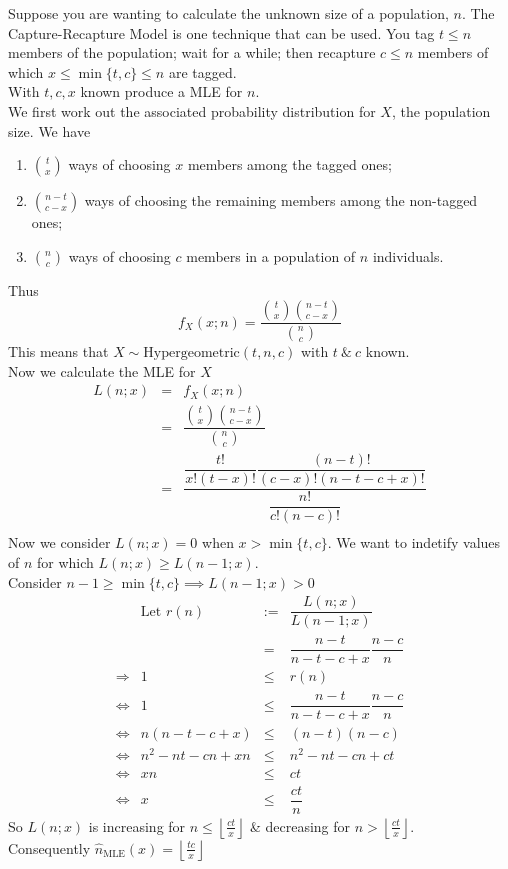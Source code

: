 \documentclass[11pt,a4paper]{article}
\begin{document}
Suppose you are wanting to calculate the unknown size of a population, $n$. The Capture-Recapture Model is one technique that can be used. You tag $t\leq n$ members of the population; wait for a while; then recapture $c\leq n$ members of which $x\leq\min\{t,c\}\leq n$ are tagged.\\
With $t,c,x$ known produce a MLE for $n$.\\
We first work out the associated probability distribution for $X$, the population size. We have
\begin{enumerate}[label=\roman*)]
	\item ${t \choose x}$ ways of choosing $x$ members among the tagged ones;
	\item ${{n-t} \choose {c-x}}$ ways of choosing the remaining members among the non-tagged ones;
	\item ${n \choose c}$ ways of choosing $c$ members in a population of $n$ individuals.
\end{enumerate}
Thus
$$f_X(x;n)=\frac{{t \choose x}{{n-t} \choose {c-x}}}{{n \choose c}}$$
This means that $X\sim\text{Hypergeometric}(t,n,c)$ with $t\ \&\ c$ known.\\
Now we calculate the MLE for $X$
\[\begin{array}{rcl}
L(n;x)&=&f_X(x;n)\\
&=&\dfrac{{t \choose x}{{n-t} \choose {c-x}}}{{n \choose c}}\\
&=&\dfrac{\dfrac{t!}{x!(t-x)!}\dfrac{(n-t)!}{(c-x)!(n-t-c+x)!}}{\dfrac{n!}{c!(n-c)!}}\\
\end{array}\]
Now we consider $L(n;x)=0$ when $x>\min\{t,c\}$. We want to indetify values of $n$ for which $L(n;x)\geq L(n-1;x)$.\\
Consider $n-1\geq\min\{t,c\}\implies L(n-1;x)>0$
\[\begin{array}{rrrl}
&\text{Let }r(n)&:=&\dfrac{L(n;x)}{L(n-1;x)}\\
&&=&\dfrac{n-t}{n-t-c+x}\dfrac{n-c}{n}\\
\Rightarrow&1&\leq&r(n)\\
\Leftrightarrow&1&\leq&\dfrac{n-t}{n-t-c+x}\dfrac{n-c}{n}\\
\Leftrightarrow&n(n-t-c+x)&\leq&(n-t)(n-c)\\
\Leftrightarrow&n^2-nt-cn+xn&\leq&n^2-nt-cn+ct\\
\Leftrightarrow&xn&\leq&ct\\
\Leftrightarrow&x&\leq&\dfrac{ct}{n}
\end{array}\]
So $L(n;x)$ is increasing for $n\leq\left\lfloor\frac{ct}{x}\right\rfloor$ \& decreasing for $n>\left\lfloor\frac{ct}{x}\right\rfloor$.\\
Consequently $\hat{n}_{\text{MLE}}(x)=\left\lfloor\frac{tc}{x}\right\rfloor$
\end{document}
